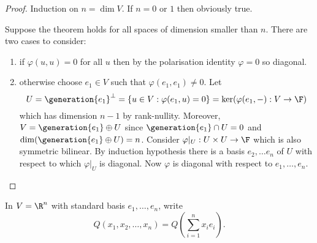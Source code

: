 \documentclass[a4paper]{article}
\newcommand*{\spans}{\generation}
\theoremstyle{definition}
\begin{document}
\begin{proof}
  Induction on \(n = \dim V\). If \(n = 0\) or \(1\) then obviously true.

  Suppose the theorem holds for all spaces of dimension smaller than \(n\). There are two cases to consider:
  \begin{enumerate}
  \item if \(\varphi(u, u ) = 0\) for all \(u\) then by the polarisation identity \(\varphi = 0\) so diagonal.
  \item otherwise choose \(e_1 \in V\) such that \(\varphi(e_1, e_1) \neq 0\). Let
    \[
      U = \spans{e_1}^\perp = \{u \in V: \varphi(e_1, u) = 0\} = \ker (\varphi(e_1, -): V \to \F)
    \]
    which has dimension \(n - 1\) by rank-nullity. Moreover, \(V = \spans{e_1} \oplus U\) since \(\spans{e_1} \cap U = 0\) and \(\dim(\spans{e_1} \oplus U) = n\). Consider \(\varphi|_U: U \times U \to \F\) which is also symmetric bilinear. By induction hypothesis there is a basis \(e_2, \dots e_n\) of \(U\) with respect to which \(\varphi|_U\) is diagonal. Now \(\varphi\) is diagonal with respect to \(e_1, \dots, e_n\).
  \end{enumerate}
\end{proof}

\begin{notation}
  In \(V = \R^n\) with standard basis \(e_1, \dots, e_n\), write
  \[
    Q(x_1, x_2, \dots, x_n) = Q \left(\sum_{i = 1}^n x_i e_i \right).
  \]
\end{notation}
\end{document}
